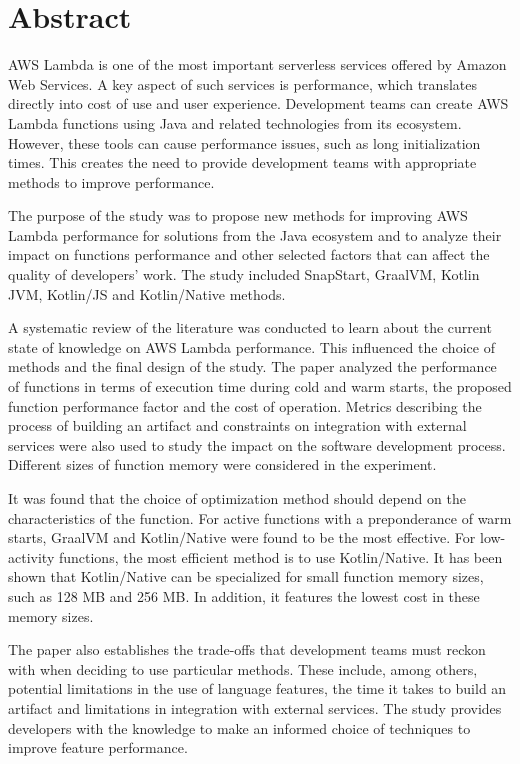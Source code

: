 \newpage
\section*{Abstract}

AWS Lambda is one of the most important serverless services offered by Amazon Web Services.
A key aspect of such services is performance, which translates directly into cost of use and user experience.
Development teams can create AWS Lambda functions using Java and related technologies from its ecosystem.
However, these tools can cause performance issues, such as long initialization times.
This creates the need to provide development teams with appropriate methods to improve performance.

The purpose of the study was to propose new methods for improving AWS Lambda performance for solutions from the Java ecosystem and to analyze their impact on functions performance and other selected factors that can affect the quality of developers' work.
The study included SnapStart, GraalVM, Kotlin JVM, Kotlin/JS and Kotlin/Native methods.

A systematic review of the literature was conducted to learn about the current state of knowledge on AWS Lambda performance.
This influenced the choice of methods and the final design of the study.
The paper analyzed the performance of functions in terms of execution time during cold and warm starts, the proposed function performance factor and the cost of operation.
Metrics describing the process of building an artifact and constraints on integration with external services were also used to study the impact on the software development process.
Different sizes of function memory were considered in the experiment.

It was found that the choice of optimization method should depend on the characteristics of the function.
For active functions with a preponderance of warm starts, GraalVM and Kotlin/Native were found to be the most effective.
For low-activity functions, the most efficient method is to use Kotlin/Native.
It has been shown that Kotlin/Native can be specialized for small function memory sizes, such as 128 MB and 256 MB.
In addition, it features the lowest cost in these memory sizes.

The paper also establishes the trade-offs that development teams must reckon with when deciding to use particular methods.
These include, among others, potential limitations in the use of language features, the time it takes to build an artifact and limitations in integration with external services.
The study provides developers with the knowledge to make an informed choice of techniques to improve feature performance.
